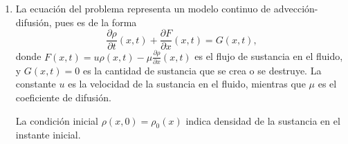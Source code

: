 \documentclass[11pt]{report}
\begin{document}
\begin{solution}
    \hfill
    \begin{enumerate}
        \item La ecuación del problema representa un modelo continuo de advección-difusión, pues es de la forma
        \[\frac{\partial \rho}{\partial t}(x,t) + \frac{\partial F}{\partial x}(x,t) = G(x,t),\]
        donde $F(x,t) = u\rho(x,t) - \mu\frac{\partial\rho}{\partial x} (x,t)$ es el flujo de sustancia en el fluido, y $G(x,t)=0$ es la cantidad de sustancia que se crea o se destruye. La constante $u$ es la velocidad de la sustancia en el fluido, mientras que $\mu$ es el coeficiente de difusión.

        La condición inicial $\rho(x,0) = \rho_0(x)$ indica densidad de la sustancia en el instante inicial.


\end{enumerate}
\end{solution}
\end{document}
